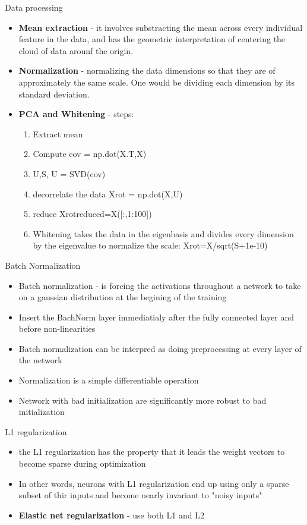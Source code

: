 \documentclass[10pt,mathserif]{beamer}
\begin{document}
\begin{frame}{Data processing}
\begin{itemize}
\item \textbf{Mean extraction} - it involves substracting the mean across every individual feature in the data, and has the geometric interpretation of centering the cloud of data arounf the origin.
\item \textbf{Normalization} - normalizing the data dimensions so that they are of approximately the same scale. One would be dividing each dimension by its standard deviation.
\item \textbf{PCA and Whitening} - steps:
\begin{enumerate}
\item Extract mean
\item Compute cov = np.dot(X.T,X)
\item U,S, U = SVD(cov)
\item decorrelate the data Xrot = np.dot(X,U)
\item reduce Xrotreduced=X([:,1:100])
\item Whitening takes the data in the eigenbasis and divides every dimension by the eigenvalue to 
normalize the scale: Xrot=X/sqrt(S+1e-10)
\end{enumerate}
\end{itemize}
\end{frame}

\begin{frame}{Batch Normalization}
\begin{itemize}
\item Batch normalization - is forcing the activations throughout a network to take on a gaussian 
distribution at the begining of the training
\item Insert the BachNorm layer immediatialy after the fully connected layer and before non-linearities
\item Batch normalization can be interpred as doing preprocessing at every layer of the network
\item Normalization is a simple differentiable operation
\item Network with bad initialization are significantly more robust to bad initialization
\end{itemize}
\end{frame}

\begin{frame}{L1 regularization}
\begin{itemize}
\item the L1 regularization has the property that it leads the weight vectors to become sparse during optimization
\item In other words, neurons with L1 regularization end up using only a sparse subset of thir inputs and become nearly invariant to "noisy inputs"
\item \textbf{Elastic net regularization} -  use both L1 and L2
\end{itemize}
\end{frame}
\end{document}
